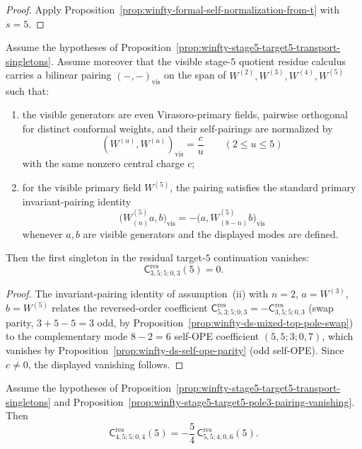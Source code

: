 \begin{proof}
Apply Proposition~\ref{prop:winfty-formal-self-normalization-from-t} with $s=5$.
\end{proof}

\begin{proposition}
\label{prop:winfty-stage5-target5-pole3-pairing-vanishing}
Assume the hypotheses of
Proposition~\ref{prop:winfty-stage5-target5-transport-singletons}.
Assume moreover that the visible stage-$5$ quotient residue calculus
carries a bilinear pairing \((-, -)_{\mathrm{vis}}\) on the span of
\(W^{(2)},W^{(3)},W^{(4)},W^{(5)}\) such that:
\begin{enumerate}[label=\textup{(\roman*)}]
\item the visible generators are even Virasoro-primary fields,
  pairwise orthogonal for distinct conformal weights, and their
  self-pairings are normalized by
  \[
  (W^{(u)},W^{(u)})_{\mathrm{vis}}=\frac{c}{u}
  \qquad (2\le u\le 5)
  \]
  with the same nonzero central charge \(c\);
\item for the visible primary field \(W^{(5)}\), the pairing satisfies
  the standard primary invariant-pairing identity
  \[
  \bigl(W^{(5)}_{(n)}a,b\bigr)_{\mathrm{vis}}
  =
  -\bigl(a,W^{(5)}_{(8-n)}b\bigr)_{\mathrm{vis}}
  \]
  whenever \(a,b\) are visible generators and the displayed modes are
  defined.
\end{enumerate}
Then the first singleton in the residual target-$5$ continuation
vanishes:
\[
\mathsf{C}^{\mathrm{res}}_{3,5;5;0,3}(5)=0.
\]
\end{proposition}

\begin{proof}
The invariant-pairing identity of assumption~\textup{(ii)} with \(n=2\), \(a=W^{(3)}\), \(b=W^{(5)}\) relates the reversed-order coefficient \(\mathsf{C}^{\mathrm{res}}_{5,3;5;0,3}=-\mathsf{C}^{\mathrm{res}}_{3,5;5;0,3}\) (swap parity, \(3+5-5=3\) odd, by Proposition~\ref{prop:winfty-ds-mixed-top-pole-swap}) to the complementary mode \(8-2=6\) self-OPE coefficient \((5,5;3;0,7)\), which vanishes by Proposition~\ref{prop:winfty-ds-self-ope-parity} (odd self-OPE).  Since \(c\neq 0\), the displayed vanishing follows.
\end{proof}

\begin{proposition}
\label{prop:winfty-stage5-target5-pole4-from-self-return}
Assume the hypotheses of
Proposition~\ref{prop:winfty-stage5-target5-transport-singletons} and
Proposition~\ref{prop:winfty-stage5-target5-pole3-pairing-vanishing}.
Then
\[
\mathsf{C}^{\mathrm{res}}_{4,5;5;0,4}(5)
=
-\frac{5}{4}\,
\mathsf{C}^{\mathrm{res}}_{5,5;4;0,6}(5).
\]
\end{proposition}

